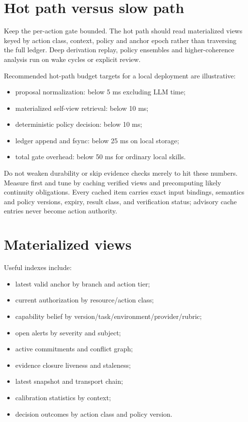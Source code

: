 \documentclass[11pt,oneside]{report}
\begin{document}
\section{Hot path versus slow path}

Keep the per-action gate bounded. The hot path should read materialized views keyed by action class, context, policy and anchor epoch rather than traversing the full ledger. Deep derivation replay, policy ensembles and higher-coherence analysis run on wake cycles or explicit review.

Recommended hot-path budget targets for a local deployment are illustrative:

\begin{itemize}
  \item proposal normalization: below 5 ms excluding LLM time;
  \item materialized self-view retrieval: below 10 ms;
  \item deterministic policy decision: below 10 ms;
  \item ledger append and fsync: below 25 ms on local storage;
  \item total gate overhead: below 50 ms for ordinary local skills.
\end{itemize}

Do not weaken durability or skip evidence checks merely to hit these numbers. Measure first and tune by caching verified views and precomputing likely continuity obligations. Every cached item carries exact input bindings, semantics and policy versions, expiry, result class, and verification status; advisory cache entries never become action authority.

\section{Materialized views}

Useful indexes include:

\begin{itemize}
  \item latest valid anchor by branch and action tier;
  \item current authorization by resource/action class;
  \item capability belief by version/task/environment/provider/rubric;
  \item open alerts by severity and subject;
  \item active commitments and conflict graph;
  \item evidence closure liveness and staleness;
  \item latest snapshot and transport chain;
  \item calibration statistics by context;
  \item decision outcomes by action class and policy version.
\end{itemize}
\end{document}
